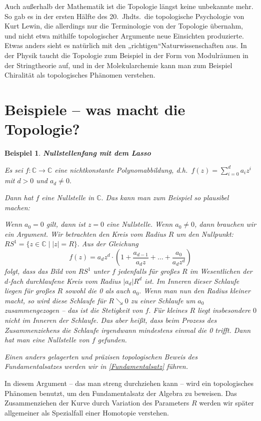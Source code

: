 \documentclass[12pt]{scrbook}   %
\newtheorem{bspX}[alles]{Beispiel}
\newenvironment{bsp}[1]{\begin{bspX}{\bf #1}\par\rm}{\end{bspX}}
\begin{document}
Auch außerhalb der Mathematik ist die Topologie längst keine unbekannte
mehr. So gab es in der ersten Hälfte des 20.\ Jhdts.\ die topologische 
Psychologie von Kurt Lewin, die allerdings nur die Terminologie von der 
Topologie übernahm, und nicht etwa mithilfe topologischer Argumente neue
Einsichten produzierte. Etwas anders sieht es natürlich mit den 
„richtigen“Naturwissenschaften aus. In der Physik taucht
die Topologie zum Beispiel in der Form von Modulräumen in der Stringtheorie 
auf, und in der Molekularchemie kann man zum Beispiel Chiralität als
topologisches Phänomen verstehen.



\section{Beispiele -- was macht die Topologie?}

\begin{bsp}{\bf Nullstellenfang mit dem Lasso} \label{Lasso}

{\rm Es sei $f:\mathbb C\longrightarrow \mathbb C$ eine nichtkonstante 
Polynomabbildung, d.h.\ $f(z) = \sum_{i=0}^d a_iz^i$ mit $d>0$ und $a_d\neq 0.$

Dann hat $f$ eine Nullstelle in $\mathbb C.$ Das kann man zum Beispiel so 
plausibel machen:

Wenn $a_0=0$ gilt, dann ist $z=0$ eine Nullstelle. Wenn $a_0\neq 0$, dann 
brauchen wir ein Argument. Wir betrachten den Kreis vom Radius $R$ um den 
Nullpunkt: $RS^1 = \{z\in \mathbb C \mid |z|=R\}.$ Aus der Gleichung
$$f(z) = a_dz^d \cdot (1 + \frac{a_{d-1}}{a_d z} + \dots + 
\frac{a_{0}}{a_d z^d})$$ 
folgt, dass das Bild von $RS^1$ unter $f$ jedenfalls für großes $R$ im 
Wesentlichen der $d$-fach 
durchlaufene Kreis vom Radius $|a_d|R^d$ ist. Im Inneren dieser Schlaufe liegen
für großes $R$ sowohl die 0 als auch $a_0.$ Wenn man nun den Radius 
kleiner macht, so wird diese Schlaufe für $R\searrow 0$ zu einer Schlaufe um 
$a_0$
zusammengezogen -- das ist die Stetigkeit von $f.$ Für kleines $R$ liegt 
insbesondere $0$ nicht im Inneren der Schlaufe. Das aber heißt, dass beim
Prozess des Zusammenziehens die Schlaufe irgendwann mindestens einmal die 0
trifft. Dann hat man eine Nullstelle von $f$ gefunden.

Einen anders gelagerten und präzisen topologischen Beweis des 
Fundamentalsatzes werden wir in \ref{Fundamentalsatz} führen.
}
\end{bsp}

In diesem Argument -- das man streng durchziehen kann -- wird ein topologisches
Phänomen benutzt, um den Fundamentalsatz der Algebra zu beweisen. Das 
Zusammenziehen der Kurve durch Variation des Parameters $R$ werden wir später
allgemeiner als Spezialfall einer Homotopie verstehen.
\end{document}
